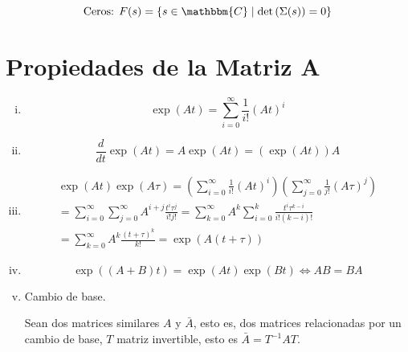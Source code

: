         \begin{equation}
            \text{Ceros: } F(s) = \left\{ s \in \mathbbm{C} \mid \det{\left( \Sigma(s) \right)} = 0 \right\}
        \end{equation}

    \section{Propiedades de la Matriz A}
        \begin{enumerate}[i)]
            \item
            \begin{equation}
                \exp{(A t)} = \sum\limits_{i=0}^{\infty} \frac{1}{i!} (A t)^i
            \end{equation}

            \item
            \begin{equation}
                \frac{d}{dt} \exp{(A t)} = A \exp{(A t)} = (\exp{(A t)}) A
            \end{equation}

            \item

            \begin{multline}
                \exp{(At)} \exp{(A \tau)} = \left( \sum\limits_{i=0}^{\infty} \frac{1}{i!} (A t)^i \right) \left( \sum\limits_{j=0}^{\infty} \frac{1}{j!} (A \tau)^j \right) \\
                = \sum\limits_{i=0}^{\infty} \sum\limits_{j=0}^{\infty} A^{i+j} \frac{t^i \tau^j}{i! j!} = \sum\limits_{k=0}^{\infty} A^k \sum\limits_{i=0}^{k} \frac{t^i \tau^{k-i}}{i! (k-i)!} \\
                = \sum\limits_{k=0}^{\infty} A^k \frac{(t + \tau)^k}{k!} = \exp{(A(t + \tau))}
            \end{multline}

            \item
            \begin{equation}
                \exp{((A + B) t)} = \exp{(A t)} \exp{(B t)} \iff A B = B A
            \end{equation}

            \item Cambio de base.

            Sean dos matrices similares $A$ y $\bar{A}$, esto es, dos matrices relacionadas por un cambio de base, $T$ matriz invertible, esto es $\bar{A} = T^{-1} A T$.


\end{enumerate}
